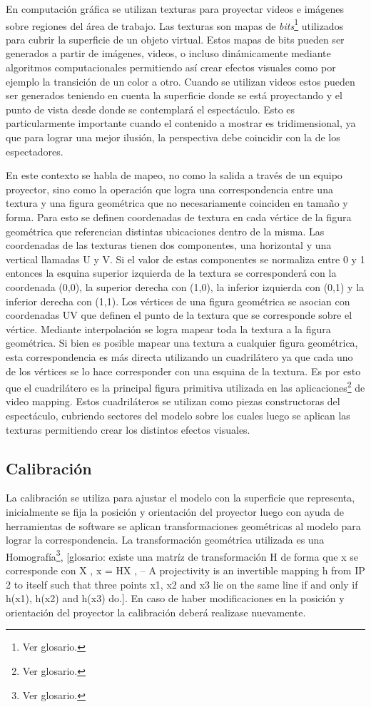 En computación gráfica se utilizan texturas para proyectar videos e imágenes sobre regiones del área de trabajo. Las texturas son mapas de \emph{bits}\footnote{Ver glosario.} utilizados para cubrir la superficie de un objeto virtual. Estos mapas de bits pueden ser generados a partir de imágenes, videos, o incluso dinámicamente mediante algoritmos computacionales permitiendo así crear efectos visuales como por ejemplo la transición de un color a otro.
Cuando se utilizan videos estos pueden ser generados teniendo en cuenta la superficie donde se está proyectando y el punto de vista desde donde se contemplará el espectáculo. Esto es particularmente importante cuando el contenido a mostrar es tridimensional, ya que para lograr una mejor ilusión, la perspectiva debe coincidir con la de los espectadores.

En este contexto se habla de mapeo, no como la salida a través de un equipo proyector, sino como la operación que logra una correspondencia entre una textura y una figura geométrica que no necesariamente coinciden en tamaño y forma. Para esto se definen coordenadas de textura en cada vértice de la figura geométrica que referencian distintas ubicaciones dentro de la misma.
Las coordenadas de las texturas tienen dos componentes, una horizontal y una vertical llamadas U y V. Si el valor de estas componentes se normaliza entre 0 y 1 entonces la esquina superior izquierda de la textura se corresponderá con la coordenada (0,0), la superior derecha con (1,0), la inferior izquierda con (0,1) y la inferior derecha con (1,1).
Los vértices de una figura geométrica se asocian con coordenadas UV que definen el punto de la textura que se corresponde sobre el vértice. Mediante interpolación se logra mapear toda la textura a la figura geométrica.
Si bien es posible mapear una textura a cualquier figura geométrica, esta correspondencia es más directa utilizando un cuadrilátero ya que cada uno de los vértices se lo hace corresponder con una esquina de la textura. Es por esto que el cuadrilátero es la principal figura primitiva utilizada en las aplicaciones\footnote{Ver glosario.} de video mapping.
Estos cuadriláteros se utilizan como piezas constructoras del espectáculo, cubriendo sectores del modelo sobre los cuales luego se aplican las texturas permitiendo crear los distintos efectos visuales.
\subsection{Calibración}
La calibración se utiliza para ajustar el modelo con la superficie que representa, inicialmente se fija la posición y orientación del proyector luego con ayuda de herramientas de software se aplican transformaciones geométricas al modelo para lograr la correspondencia. La transformación geométrica utilizada es una Homografía\footnote{Ver glosario.}, [glosario: existe una matríz de transformación H de forma que x se corresponde con X , x = HX ,   -- A projectivity is an invertible mapping h from IP 2 to itself such that three points x1, x2 and x3 lie on the same line if and only if h(x1), h(x2) and h(x3) do.].
En caso de haber modificaciones en la posición y orientación del proyector la calibración deberá realizase nuevamente.

